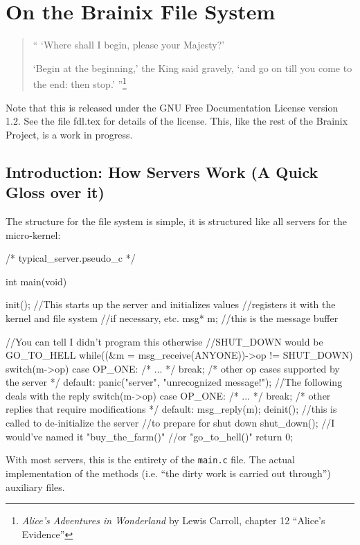 \chapter{On the Brainix File System}
\begin{quote}
 `` `Where shall I begin, please your Majesty?' 

\indent `Begin at the beginning,' the King said gravely, `and go on till you come to the end: then stop.' ''\footnote{\textit{Alice's Adventures in Wonderland} by Lewis Carroll, chapter 12 ``Alice's Evidence''}
\end{quote}

Note that this is released under the GNU Free Documentation License version 1.2. See the file fdl.tex for details of the license. This, like the rest of the Brainix Project, is a work in progress.\
\section{Introduction: How Servers Work (A Quick Gloss over it)}
The structure for the file system is simple, it is structured like all servers for the micro-kernel:
\begin{code}
/* typical_server.pseudo_c */

int main(void) {
     init(); //This starts up the server and initializes values
             //registers it with the kernel and file system
             //if necessary, etc.
     msg* m; //this is the message buffer

     //You can tell I didn't program this otherwise 
     //SHUT_DOWN would be GO_TO_HELL
     while((&m = msg_receive(ANYONE))->op != SHUT_DOWN) 
     {
          switch(m->op) {
               case OP_ONE: /* ... */ break;
               /* other op cases supported by the server */
               default: panic("server", "unrecognized message!");
          }
          //The following deals with the reply
          switch(m->op)
          {
               case OP_ONE: /* ... */ break;
               /* other replies that require modifications */
               default: msg_reply(m);
          }
     }
     deinit(); //this is called to de-initialize the server
               //to prepare for shut down
     shut_down(); //I would've named it "buy_the_farm()"
                  //or "go_to_hell()"
     return 0;
}
\end{code}
With most servers, this is the entirety of the \verb|main.c| file. The actual implementation of the methods (i.e. ``the dirty work is carried out through'') auxiliary files.

